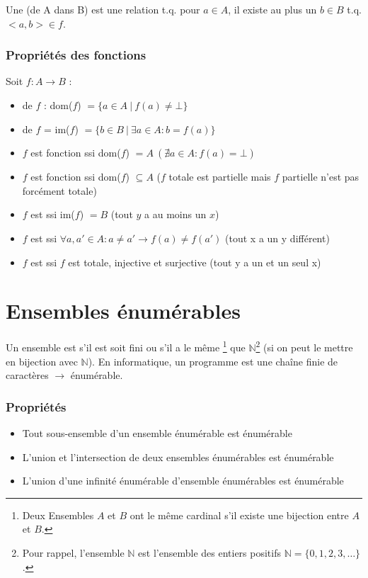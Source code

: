 Une  (de A dans B) est une relation t.q. pour $a \in A$, il existe au plus un $b \in B$ t.q. $<a, b> \in f$.

\subsubsection{Propriétés des fonctions}

Soit $f : A \rightarrow B$ :
\begin{itemize}
\item {} de $f$ : dom($f$) $= \{a \in A \ | \ f(a) \neq \bot\}$
\item {} de $f$ = im($f$) $= \{b \in B \ | \ \exists a \in A : b = f(a)\}$
\item $f$ est fonction  ssi dom($f$) $= A \ (\nexists a \in A : f(a) = \bot)$ 
\item $f$ est fonction  ssi dom($f$) $\subseteq A$ ($f$ totale est partielle mais $f$ partielle n'est pas forcément totale)
\item $f$ est  ssi im($f$) $= B$ (tout $y$ a au moins un $x$)
\item $f$ est  ssi $\forall a, a' \in A : a \neq a' \rightarrow f(a) \neq f(a')$ (tout x a un y différent)
\item $f$ est  ssi $f$ est totale, injective et surjective (tout y a un et un seul x)
\end{itemize}

\section{Ensembles énumérables}

Un ensemble est  s'il est soit fini ou s'il a le même \footnote{Deux Ensembles $A$ et $B$ ont le même cardinal s'il existe une bijection entre $A$ et $B$.} que $\mathbb{N}$\footnote{Pour rappel, l'ensemble $\mathbb{N}$ est l'ensemble des entiers positifs $\mathbb{N} = \{0, 1, 2, 3, \ldots\}$.} (si on peut le mettre en bijection avec $\mathbb{N}$). En informatique, un programme est une chaîne finie de caractères $\rightarrow$ énumérable.

\subsubsection{Propriétés}

\begin{itemize}
\item Tout sous-ensemble d'un ensemble énumérable est énumérable
\item L'union et l'intersection de deux ensembles énumérables est énumérable
\item L'union d'une infinité énumérable d'ensemble énumérables est énumérable
\end{itemize}

